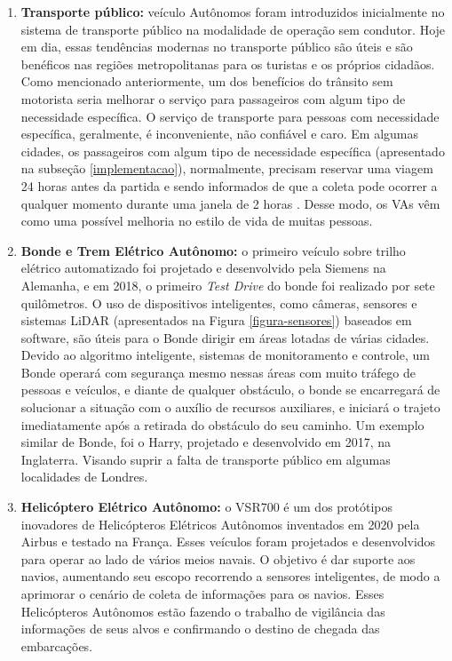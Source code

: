 \begin{enumerate}
\item \textbf{Transporte público:} veículo Autônomos foram introduzidos inicialmente no sistema de transporte público na modalidade de operação sem condutor. Hoje em dia, essas tendências modernas no transporte público são úteis e são benéficos nas regiões metropolitanas para os turistas e os próprios cidadãos. Como mencionado anteriormente, um dos benefícios do trânsito sem motorista seria melhorar o serviço para passageiros com algum tipo de necessidade específica. O serviço de transporte para pessoas com necessidade específica, geralmente, é inconveniente, não confiável e caro. Em algumas cidades, os passageiros com algum tipo de necessidade específica (apresentado na subseção \ref{implementacao}), normalmente, precisam reservar uma viagem 24 horas antes da partida e sendo informados de que a coleta pode ocorrer a qualquer momento durante uma janela de 2 horas \cite{notif}. Desse modo, os VAs vêm como uma possível melhoria no estilo de vida de muitas pessoas.
\item \textbf{Bonde e Trem Elétrico Autônomo:} o primeiro veículo sobre trilho elétrico automatizado foi projetado e desenvolvido pela Siemens na Alemanha, e em 2018, o primeiro \textit{Test Drive} do bonde foi realizado por sete quilômetros. O uso de dispositivos inteligentes, como câmeras, sensores e sistemas LiDAR (apresentados na Figura \ref{figura-sensores}) baseados em software, são úteis para o Bonde dirigir em áreas lotadas de várias cidades. Devido ao algoritmo inteligente, sistemas de monitoramento e controle, um Bonde operará com segurança mesmo nessas áreas com muito tráfego de pessoas e veículos, e diante de qualquer obstáculo, o bonde se encarregará de solucionar a situação com o auxílio de recursos auxiliares, e iniciará o trajeto imediatamente após a retirada do obstáculo do seu caminho. Um exemplo similar de Bonde, foi o Harry, projetado e desenvolvido em 2017, na Inglaterra. Visando suprir a falta de transporte público em algumas localidades de Londres.
\item \textbf{Helicóptero Elétrico Autônomo:} o VSR700 é um dos protótipos inovadores de Helicópteros Elétricos Autônomos inventados em 2020 pela Airbus e testado na França. Esses veículos foram projetados e desenvolvidos para operar ao lado de vários meios navais. O objetivo é dar suporte aos navios, aumentando seu escopo recorrendo a sensores inteligentes, de modo a aprimorar o cenário de coleta de informações para os navios. Esses Helicópteros Autônomos estão fazendo o trabalho de vigilância das informações de seus alvos e confirmando o destino de chegada das embarcações.

\end{enumerate}
